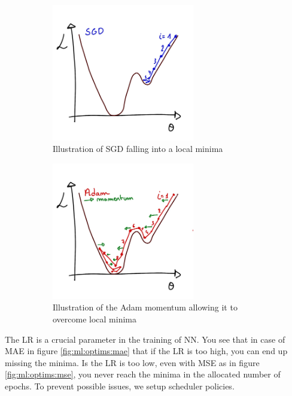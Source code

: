 \documentclass[../main.tex]{subfiles}
\begin{document}
\begin{figure}
  \centering
  \begin{subfigure}[t]{0.48\linewidth}
    \includegraphics[height=6cm]{images/ml/sgd.jpg}
    \caption{Illustration of SGD falling into a local minima}
    \label{fig:ml:sgd}
  \end{subfigure}
  \hfill
  \begin{subfigure}[t]{0.48\linewidth}
    \includegraphics[height=6cm]{images/ml/Adam.jpg}
    \caption{Illustration of the Adam momentum allowing it to overcome local minima}
    \label{fig:ml:adam}
  \end{subfigure}
  \caption{}
\end{figure}

The LR is a crucial parameter in the training of NN. You see that in case of MAE in figure \ref{fig:ml:optims:mae} that if the LR is too high, you can end up missing the minima. Is the LR is too low, even with MSE as in figure \ref{fig:ml:optims:mse}, you never reach the minima in the allocated number of epochs. To prevent possible issues, we setup scheduler policies.
\end{document}
